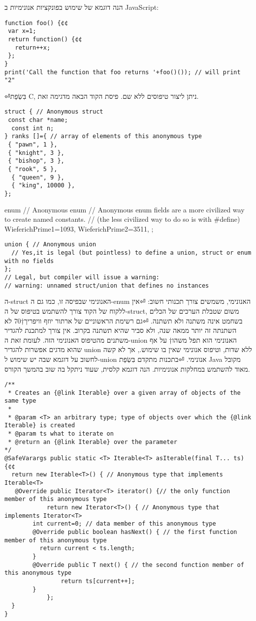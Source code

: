 \begin{טבלא}[!htbp]
הנה דוגמא של שימוש בפונקציות אנונימיות ב JavaScript:
\begin{verbatim}
function foo() {¢¢
 var x=1;
 return function() {¢¢
   return++x;
 };
}
print('Call the function that foo returns '+foo()()); // will print "2"
\end{verbatim}

⏎בִּשְׂפַת C, ניתן ליצור טיפוסים ללא שם. פיסת הקוד הבאה מדגימה זאת.
\begin{verbatim}
struct { // Anonymous struct
 const char *name;
  const int n;
} ranks []={ // array of elements of this anonymous type
 { "pawn", 1 },
 { "knight", 3 },
 { "bishop", 3 },
 { "rook", 5 },
  { "queen", 9 },
  { "king", 10000 },
};
\end{verbatim}

\begin{CPP}
enum { // Anonymous enum
 // Anonymous enum fields are a more civilized way to create named constants.
  // (the less civilized way to do so is with #define)
  WieferichPrime1=1093,
  WieferichPrime2=3511,
};
\end{CPP}

\begin{verbatim}
union { // Anonymous union
  // Yes,it is legal (but pointless) to define a union, struct or enum with no fields
};
// Legal, but compiler will issue a warning:
// warning: unnamed struct/union that defines no instances
\end{verbatim}

      ה-struct האנונימי שבפיסה זו, כמו גם ה-enum האנונימי, משמשים צורך תכנותי חשוב:
⏎אין ללקוח של הקוד צורך להשתמש בטיפוס של ה-struct, משום שטבלת הערכים של הכלים בשחמט אינה משתנה ולא תשתנה.
⏎גם רשימת הראשוניים של ארתור יוזף וויפריך†{70} לא השתנתה זה יותר ממאה שנה, ולא סביר שהיא תשתנה בקרוב. אין צורך למתכנת להגדיר משתנים מהטיפוס האנונימי הזה.
      לעומת זאת ה-union האנונימי הוא תפל משהו†{ על אף שהוא מדגים אפשרות להגדיר union ללא שדות, וטיפוס אנונימי שאין בו שימוש.}, אך לא קשה לחשוב על דוגמא שבה יש שימוש ל-union אנונימי.
⏎בתכנות מתקדם בִּשְׂפַת Java מקובל מאוד להשתמש במחלקות אנונימיות. הנה דוגמא קלסית, שעוד ניתקל בה שוב בהמשך הקורס.
\begin{verbatim}
/**
 * Creates an {@link Iterable} over a given array of objects of the same type
 *
 * @param <T> an arbitrary type; type of objects over which the {@link Iterable} is created
 * @param ts what to iterate on
 * @return an {@link Iterable} over the parameter
*/
@SafeVarargs public static <T> Iterable<T> asIterable(final T... ts) {¢¢
  return new Iterable<T>() { // Anonymous type that implements Iterable<T>
   @Override public Iterator<T> iterator() {// the only function member of this anonymous type
            return new Iterator<T>() { // Anonymous type that implements Iterator<T>
        int current=0; // data member of this anonymous type
        @Override public boolean hasNext() { // the first function member of this anonymous type
          return current < ts.length;
        }
        @Override public T next() { // the second function member of this anonymous type
                return ts[current++];
        }
            };
  }
}
\end{verbatim}


\end{טבלא}
